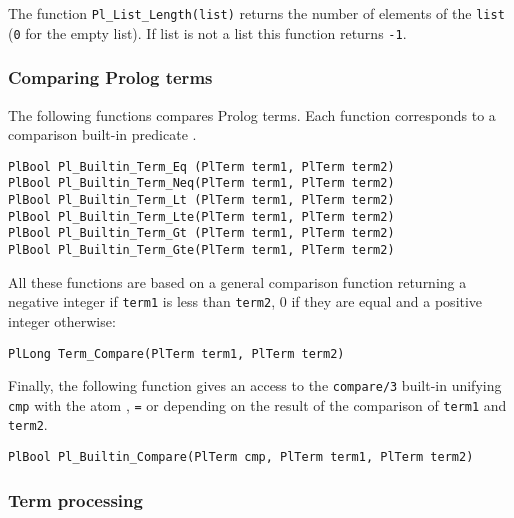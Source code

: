 The function \texttt{Pl\_List\_Length(list)} returns the number of elements of
the \texttt{list} (\texttt{0} for the empty list). If list is not a list
this function returns \texttt{-1}.

\subsubsection{Comparing Prolog terms}

The following functions compares Prolog terms. Each function corresponds to
a comparison built-in predicate .

\begin{Indentation}
\begin{verbatim}
PlBool Pl_Builtin_Term_Eq (PlTerm term1, PlTerm term2)
PlBool Pl_Builtin_Term_Neq(PlTerm term1, PlTerm term2)
PlBool Pl_Builtin_Term_Lt (PlTerm term1, PlTerm term2)
PlBool Pl_Builtin_Term_Lte(PlTerm term1, PlTerm term2)
PlBool Pl_Builtin_Term_Gt (PlTerm term1, PlTerm term2)
PlBool Pl_Builtin_Term_Gte(PlTerm term1, PlTerm term2)
\end{verbatim}
\end{Indentation}

All these functions are based on a general comparison function returning a
negative integer if \texttt{term1} is less than \texttt{term2}, 0 if they
are equal and a positive integer otherwise:

\begin{Indentation}
\begin{verbatim}
PlLong Term_Compare(PlTerm term1, PlTerm term2)
\end{verbatim}
\end{Indentation}

Finally, the following function gives an access to the \texttt{compare/3}
built-in  unifying \texttt{cmp} with the
atom \texttt{{\lt}}, \texttt{=} or \texttt{{\gt}} depending on the result of
the comparison of \texttt{term1} and \texttt{term2}.

\begin{Indentation}
\begin{verbatim}
PlBool Pl_Builtin_Compare(PlTerm cmp, PlTerm term1, PlTerm term2)
\end{verbatim}
\end{Indentation}




\subsubsection{Term processing}

